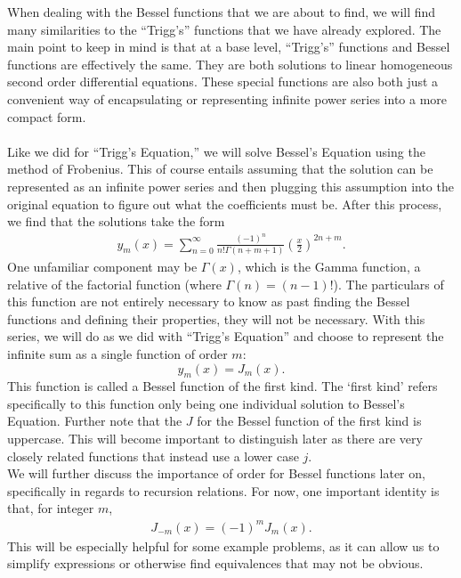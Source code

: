 \documentclass[11pt]{report}
\newcommand{\fpar}[1]{\left({#1}\right)}
\begin{document}
When dealing with the Bessel functions that we are about to find, we will find many similarities to the ``Trigg's'' functions that we have already explored. The main point to keep in mind is that at a base level, ``Trigg's'' functions and Bessel functions are effectively the same. They are both solutions to linear homogeneous second order differential equations. These special functions are also both just a convenient way of encapsulating or representing infinite power series into a more compact form. %
\\\\
Like we did for ``Trigg's Equation,'' we will solve Bessel's Equation using the method of Frobenius. This of course entails assuming that the solution can be represented as an infinite power series and then plugging this assumption into the original equation to figure out what the coefficients must be. After this process, we find that the solutions take the form
    \begin{align*}
        y_m(x) = \sum_{n=0}^\infty \frac{\fpar{-1}^n}{n!\Gamma\fpar{n+m+1}}\fpar{\frac{x}{2}}^{2n+m}. 
    \end{align*}
One unfamiliar component may be $\Gamma(x)$, which is the Gamma function, a relative of the factorial function (where $\Gamma(n)=(n-1)!$). The particulars of this function are not entirely necessary to know as past finding the Bessel functions and defining their properties, they will not be necessary. With this series, we will do as we did with ``Trigg's Equation'' and choose to represent the infinite sum as a single function of order $m$:
    \begin{equation}
        y_m(x) = J_m(x).
    \end{equation}
This function is called a Bessel function of the first kind. The `first kind' refers specifically to this function only being one individual solution to Bessel's Equation. Further note that the $J$ for the Bessel function of the first kind is uppercase. This will become important to distinguish later as there are very closely related functions that instead use a lower case $j$.\\

We will further discuss the importance of order for Bessel functions later on, specifically in regards to recursion relations. For now, one important identity is that, for integer $m$,
    \begin{align}
        J_{-m}(x) = (-1)^mJ_{m}(x).
    \end{align}
This will be especially helpful for some example problems, as it can allow us to simplify expressions or otherwise find equivalences that may not be obvious.\\
\end{document}

